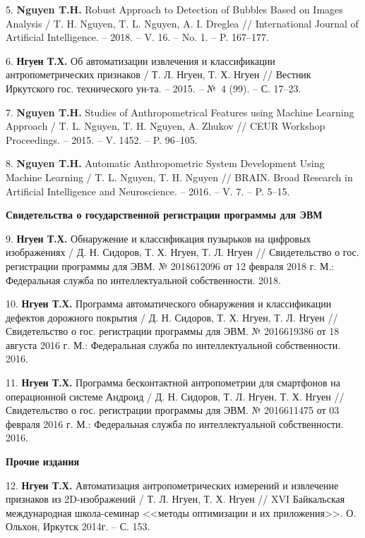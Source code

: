 5. \textbf{Nguyen T.H.} Robust Approach to Detection of Bubbles Based on Images Analysis / T. H. Nguyen, T. L. Nguyen, A. I. Dreglea // International Journal of Artificial Intelligence. -- 2018. -- V. 16. -- No. 1. -- P. 167--177.

6. \textbf{Нгуен Т.Х.} Об автоматизации извлечения и классификации антропометрических признаков / Т. Л. Нгуен, Т. Х. Нгуен // Вестник Иркутского гос. технического ун-та. -- 2015. -- №~4 (99). -- С. 17--23.

7. \textbf{Nguyen T.H.} Studies of Anthropometrical Features using Machine Learning Approach / T. L. Nguyen, T. H. Nguyen, A. Zhukov // CEUR Workshop Proceedings. -- 2015. -- V. 1452. -- P. 96--105.

8. \textbf{Nguyen T.H.} Automatic Anthropometric System Development Using Machine Learning / T. L. Nguyen, T. H. Nguyen // BRAIN. Broad Research in Artificial Intelligence and Neuroscience. -- 2016. -- V. 7. -- P. 5--15.

 \newpage \hspace{-1.5cm}\textbf{Свидетельства о государственной регистрации программы для ЭВМ}

9. \textbf{Нгуен Т.Х.} Обнаружение и классификация пузырьков на цифровых изображениях / Д. Н. Сидоров, Т. Х. Нгуен, Т. Л. Нгуен // Свидетельство о гос. регистрации программы для ЭВМ. № 2018612096 от 12 февраля 2018 г. М.: Федеральная служба по интеллектуальной собственности. 2018.

10. \textbf{Нгуен Т.Х.} Программа автоматического обнаружения и классификации дефектов дорожного покрытия / Д. Н. Сидоров, Т. Х. Нгуен, Т. Л. Нгуен // Свидетельство о гос. регистрации программы для ЭВМ. № 2016619386 от 18 августа 2016 г. М.: Федеральная служба по интеллектуальной собственности. 2016.

11. \textbf{Нгуен Т.Х.} Программа бесконтактной антропометрии для смартфонов на операционной системе Андроид / Д. Н. Сидоров, Т. Л. Нгуен, Т. Х. Нгуен // Свидетельство о гос. регистрации программы для ЭВМ. № 2016611475 от 03 февраля 2016 г. М.: Федеральная служба по интеллектуальной собственности. 2016.
	
	\hspace{-1.5cm}\textbf{Прочие издания}
	
12. \textbf{Нгуен Т.Х.} Автоматизация антропометрических измерений и извлечение признаков из 2D-изображений / Т. Л. Нгуен, Т. Х. Нгуен // XVI Байкальская международная школа-семинар <<методы оптимизации и их приложения>>. О. Ольхон, Иркутск 2014г. -- С. 153.

